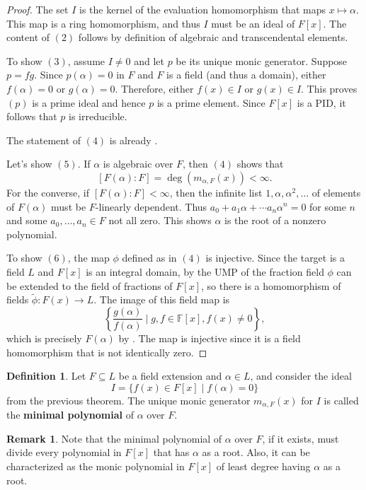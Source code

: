 \documentclass[12pt]{report}
\numberwithin{equation}{section}
\numberwithin{theorem}{chapter}
\theoremstyle{definition}
\newtheorem{definition}[theorem]{Definition}
\newtheorem*{basic properties}{Basic Properties}
\newtheorem*{Important Remark}{Important Remark}
\newtheorem{remark}[theorem]{Remark}
\newcommand{\df}[1]{{\bf #1}\index{#1}}
\newcommand{\F}{\mathbb{F}}
\begin{document}
\begin{proof} 
The set $I$ is the kernel of the evaluation homomorphism that maps $x\mapsto \alpha$. This map is a ring homomorphism, and thus $I$ must be an ideal of $F[x]$. The content of $(2)$ follows by definition of algebraic and transcendental elements.

To show $(3)$, assume $I \neq 0$ and let $p$ be its unique monic generator. Suppose $p = f g$. Since $p(\alpha) = 0$ in $F$ and $F$ is a field (and thus a domain), either $f(\alpha) = 0$ or $g(\alpha) = 0$. Therefore, either $f(x) \in I$ or $g(x) \in I$. This proves $(p)$ is a prime ideal and hence $p$ is a prime element. Since $F[x]$ is a PID, it follows that $p$ is irreducible.

The statement of $(4)$ is already .

Let's show $(5)$. If $\alpha$ is algebraic over $F$, then $(4)$ shows that 
$$[F(\alpha):F] = \deg(m_{\alpha, F}(x)) < \infty.$$ 
For the converse, if $[F(\alpha): F] < \infty$, then the infinite list $1, \alpha, \alpha^2, \ldots$ of elements of $F(\alpha)$ must be $F$-linearly dependent. Thus $a_0 + a_1 \alpha + \cdots a_n \alpha^n = 0$ for some $n$ and some $a_0, \dots, a_n \in F$ not all zero. This shows $\alpha$ is the root of a nonzero polynomial.

To show $(6)$, the map $\phi$ defined as in $(4)$ is injective. Since the target is a field $L$ and $F[x]$ is an integral domain, by the UMP of the fraction field $\phi$ can be extended to the field of fractions of $F[x]$, so there is a homomorphism of fields $\tilde{\phi}: F(x) \to L$. The image of this field map is 
$$\left\{\frac{g(\alpha)}{f(\alpha)} \mid g,f \in \F[x], f(x) \ne 0\right\},$$ 
which is precisely $F(\alpha)$ by . The map is injective since it is a field homomorphism that is not identically zero.
\end{proof}

\begin{definition}
Let $F \subseteq L$ be a field extension and $\alpha \in L$, and consider the ideal 
$$I = \{f(x) \in F[x] \mid f(\alpha) = 0\}$$
from the previous theorem. The unique monic generator $m_{\alpha, F}(x)$ for $I$ is called the \df{minimal polynomial} of $\alpha$ over $F$.
\end{definition}

\begin{remark}
Note that the minimal polynomial of $\alpha$ over $F$, if it exists, must divide every polynomial in $F[x]$ that has $\alpha$ as a root. Also, it can be characterized as the monic polynomial in $F[x]$ of least degree having $\alpha$ as a root. 
\end{remark}
\end{document}
